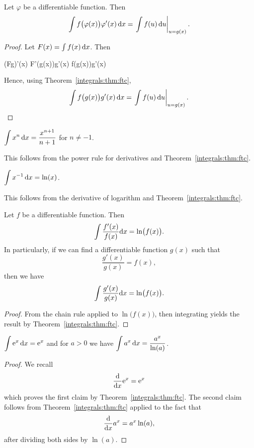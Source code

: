 \begin{corollary}\label{integrals:u-substitution}
Let $\varphi$ be a differentiable function. Then
\[ \int f\bigl(\varphi(x)\bigr)\varphi'(x)\,\mathrm{d} x = \left.\int f(u)\,\mathrm{d} u\right|_{u=g(x)}.\]
\end{corollary}

\begin{proof}
Let $F(x) = \int f(x)\,\mathrm{d} x$.
Then
\begin{calculation}
(F\circ g)'(x)
F'\bigl(g(x)\bigr)g'(x)
f\bigl(g(x)\bigr)g'(x)
\end{calculation}
Hence, using Theorem~\ref{integrals:thm:ftc},
\[ \int f\bigl(g(x)\bigr)g'(x)\,\mathrm{d} x = \left.\int f(u)\,\mathrm{d} u\right|_{u=g(x)}.\qedhere\]
\end{proof}

\label{integrals:chunk:power-rule} $\displaystyle{\int x^{n}\,\mathrm{d}x = \frac{x^{n+1}}{n+1}}$
for $n\neq-1$.

This follows from the power rule for derivatives and
Theorem~\ref{integrals:thm:ftc}.

 $\displaystyle{\int x^{-1}\,\mathrm{d}x = \ln(x)}$.

This follows from the derivative of logarithm and
Theorem~\ref{integrals:thm:ftc}.

\begin{corollary}\label{cor:integrals:log-trick}
Let $f$ be a differentiable function. Then
\[ \int\frac{f'(x)}{f(x)}\mathrm{d} x = \ln\bigl(f(x)\bigr).\]
In particularly, if we can find a differentiable function $g(x)$ such
that
\[ \frac{g'(x)}{g(x)} = f(x),\]
then we have
\begin{equation}
\int\frac{g'(x)}{g(x)}\mathrm{d} x = \ln\bigl(f(x)\bigr).
\end{equation}
\end{corollary}

\begin{proof}
From the chain rule applied to $\ln\bigl(f(x)\bigr)$, then integrating
yields the result by Theorem~\ref{integrals:thm:ftc}.
\end{proof}

 $\displaystyle{\int \mathrm{e}^{x}\,\mathrm{d}x = \mathrm{e}^{x}}$
and for $a>0$ we have $\displaystyle{\int a^{x}\,\mathrm{d}x = \frac{a^{x}}{\ln(a)}}$.

\begin{proof}
  We recall
  \begin{equation}
\frac{\mathrm{d}}{\mathrm{d} x}\mathrm{e}^{x} = \mathrm{e}^{x}
  \end{equation}
  which proves the first claim by Theorem~\ref{integrals:thm:ftc}. The
  second claim follows from Theorem~\ref{integrals:thm:ftc} applied to
  the fact that
  \begin{equation}
\frac{\mathrm{d}}{\mathrm{d} x}a^{x} = a^{x}\ln(a),
  \end{equation}
  after dividing both sides by $\ln(a)$.
\end{proof}


